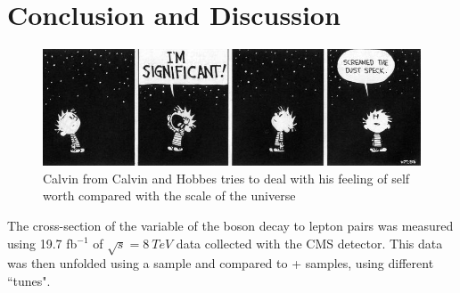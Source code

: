 \chapter{Conclusion and Discussion}
\begin{figure}[!htbp]
    \centering
    \includegraphics[width=\textwidth]{figures/CalvinAndHobs.jpg}
    \caption[]{Calvin from Calvin and Hobbes tries to deal with his feeling of self worth compared with the scale of the universe\cite{calvinAndHobs}}
    \label{fig:calvin}
\end{figure}{}

The cross-section of the variable \phistar of the \Z boson decay to lepton pairs was measured using 19.7 fb$^{-1}$ of $\sqrt{s}=\SI{8}{TeV}$ data collected with the CMS detector. This data was then unfolded using a \MADGRAPH sample and compared to \POWHEG + \PYTHIAeight samples, using different ``tunes".

